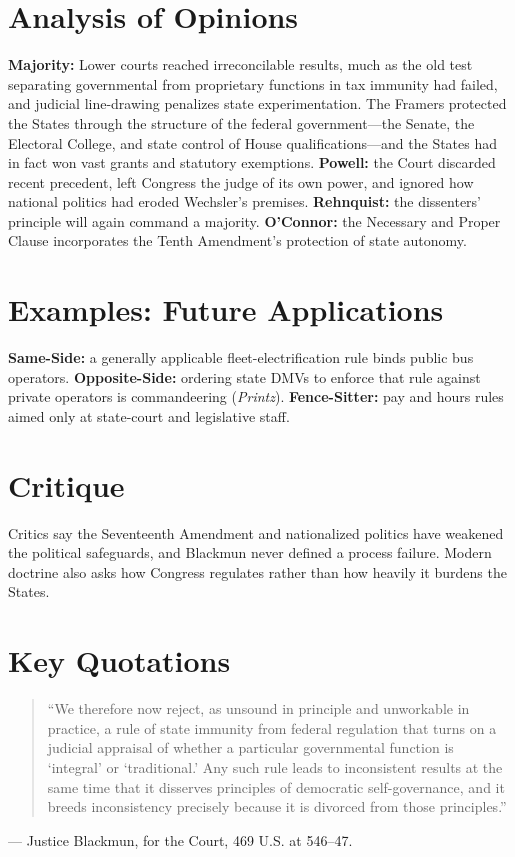 \documentclass[12pt]{article}
\begin{document}
\section{Analysis of Opinions}
\textbf{Majority:} Lower courts reached irreconcilable results, much as the old test separating governmental from proprietary functions in tax immunity had failed, and judicial line-drawing penalizes state experimentation. The Framers protected the States through the structure of the federal government---the Senate, the Electoral College, and state control of House qualifications---and the States had in fact won vast grants and statutory exemptions. \textbf{Powell:} the Court discarded recent precedent, left Congress the judge of its own power, and ignored how national politics had eroded Wechsler's premises. \textbf{Rehnquist:} the dissenters' principle will again command a majority. \textbf{O'Connor:} the Necessary and Proper Clause incorporates the Tenth Amendment's protection of state autonomy.

\section{Examples: Future Applications}
\textbf{Same-Side:} a generally applicable fleet-electrification rule binds public bus operators. \textbf{Opposite-Side:} ordering state DMVs to enforce that rule against private operators is commandeering (\textit{Printz}). \textbf{Fence-Sitter:} pay and hours rules aimed only at state-court and legislative staff.

\section{Critique}
Critics say the Seventeenth Amendment and nationalized politics have weakened the political safeguards, and Blackmun never defined a process failure. Modern doctrine also asks how Congress regulates rather than how heavily it burdens the States.

\section{Key Quotations}
\begin{quote}
``We therefore now reject, as unsound in principle and unworkable in practice, a rule of state immunity from federal regulation that turns on a judicial appraisal of whether a particular governmental function is `integral' or `traditional.' Any such rule leads to inconsistent results at the same time that it disserves principles of democratic self-governance, and it breeds inconsistency precisely because it is divorced from those principles.''
\end{quote}
\noindent --- Justice Blackmun, for the Court, 469 U.S. at 546--47.
\end{document}
